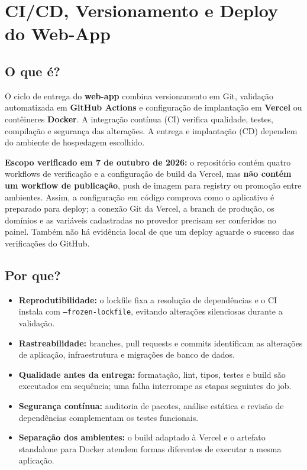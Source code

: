 \documentclass[12pt,a4paper]{article}
\begin{document}
\newpage
\section{CI/CD, Versionamento e Deploy do Web-App}
\label{sec:cicd}
\begingroup
\sloppy

\subsection{O que é?}
O ciclo de entrega do \textbf{web-app} combina versionamento em Git, validação automatizada em \textbf{GitHub Actions} e configuração de implantação em \textbf{Vercel} ou contêineres \textbf{Docker}. A integração contínua (CI) verifica qualidade, testes, compilação e segurança das alterações. A entrega e implantação (CD) dependem do ambiente de hospedagem escolhido.

\textbf{Escopo verificado em 7 de outubro de 2026:} o repositório contém quatro workflows de verificação e a configuração de build da Vercel, mas \textbf{não contém um workflow de publicação}, push de imagem para registry ou promoção entre ambientes. Assim, a configuração em código comprova como o aplicativo é preparado para deploy; a conexão Git da Vercel, a branch de produção, os domínios e as variáveis cadastradas no provedor precisam ser conferidos no painel. Também não há evidência local de que um deploy aguarde o sucesso das verificações do GitHub.

\subsection{Por que?}
\begin{itemize}
  \item \textbf{Reprodutibilidade:} o lockfile fixa a resolução de dependências e o CI instala com \texttt{--frozen-lockfile}, evitando alterações silenciosas durante a validação.
  \item \textbf{Rastreabilidade:} branches, pull requests e commits identificam as alterações de aplicação, infraestrutura e migrações de banco de dados.
  \item \textbf{Qualidade antes da entrega:} formatação, lint, tipos, testes e build são executados em sequência; uma falha interrompe as etapas seguintes do job.
  \item \textbf{Segurança contínua:} auditoria de pacotes, análise estática e revisão de dependências complementam os testes funcionais.
  \item \textbf{Separação dos ambientes:} o build adaptado à Vercel e o artefato standalone para Docker atendem formas diferentes de executar a mesma aplicação.
\end{itemize}
\end{document}
